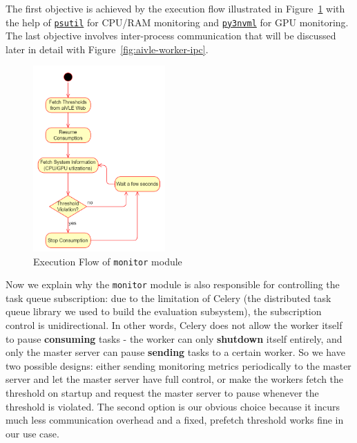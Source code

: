 The first objective is achieved by the execution flow illustrated in Figure~\ref{fig:aivle-worker-monitor-flow} with the help of \href{https://pypi.org/project/psutil/}{\texttt{psutil}} for CPU/RAM monitoring and \href{https://github.com/fbcotter/py3nvml}{\texttt{py3nvml}} for GPU monitoring. The last objective involves inter-process communication that will be discussed later in detail with Figure~\ref{fig:aivle-worker-ipc}.

\begin{figure}[H]
    \centering
    \includegraphics[width=0.45\textwidth]{images/aivle-worker-monitor-flow.png}
    \caption{Execution Flow of \texttt{monitor} module}
    \label{fig:aivle-worker-monitor-flow}
\end{figure}

Now we explain why the \texttt{monitor} module is also responsible for controlling the task queue subscription: due to the limitation of Celery (the distributed task queue library we used to build the evaluation subsystem), the subscription control is unidirectional. In other words, Celery does not allow the worker itself to pause \textbf{consuming} tasks - the worker can only \textbf{shutdown} itself entirely, and only the master server can pause \textbf{sending} tasks to a certain worker. So we have two possible designs: either sending monitoring metrics periodically to the master server and let the master server have full control, or make the workers fetch the threshold on startup and request the master server to pause whenever the threshold is violated. The second option is our obvious choice because it incurs much less communication overhead and a fixed, prefetch threshold works fine in our use case.

